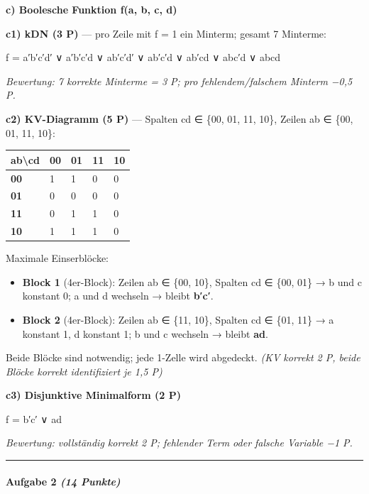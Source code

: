 \documentclass[11pt, a4paper]{article}
\begin{document}
\textbf{c) Boolesche Funktion f(a, b, c, d)}


\textbf{c1) kDN (3 P)} — pro Zeile mit f = 1 ein Minterm; gesamt 7 Minterme:


f = a′b′c′d′ ∨ a′b′c′d ∨ ab′c′d′ ∨ ab′c′d ∨ ab′cd ∨ abc′d ∨ abcd


\textit{Bewertung: 7 korrekte Minterme = 3 P; pro fehlendem/falschem Minterm −0,5 P.}


\textbf{c2) KV-Diagramm (5 P)} — Spalten cd ∈ \{00, 01, 11, 10\}, Zeilen ab ∈ \{00, 01, 11, 10\}:



{\small
\begin{tabularx}{\linewidth}{XXXXX}
\hline
\rowcolor{tableheadbg}
{\color{white}\textbf{ab\textbackslash{}cd}} & {\color{white}\textbf{00}} & {\color{white}\textbf{01}} & {\color{white}\textbf{11}} & {\color{white}\textbf{10}} \\[2pt]
\hline
\endhead
\hline
\endfoot
\textbf{00} & 1 & 1 & 0 & 0 \\
\textbf{01} & 0 & 0 & 0 & 0 \\
\textbf{11} & 0 & 1 & 1 & 0 \\
\textbf{10} & 1 & 1 & 1 & 0 \\
\end{tabularx}
}


Maximale Einserblöcke:

\begin{itemize}
  \item \textbf{Block 1} (4er-Block): Zeilen ab ∈ \{00, 10\}, Spalten cd ∈ \{00, 01\} → b und c konstant 0; a und d wechseln → bleibt \textbf{b′c′}.
  \item \textbf{Block 2} (4er-Block): Zeilen ab ∈ \{11, 10\}, Spalten cd ∈ \{01, 11\} → a konstant 1, d konstant 1; b und c wechseln → bleibt \textbf{ad}.
\end{itemize}

Beide Blöcke sind notwendig; jede 1-Zelle wird abgedeckt. \textit{(KV korrekt 2 P, beide Blöcke korrekt identifiziert je 1,5 P)}


\textbf{c3) Disjunktive Minimalform (2 P)}


f = b′c′ ∨ ad


\textit{Bewertung: vollständig korrekt 2 P; fehlender Term oder falsche Variable −1 P.}



\noindent\textcolor{rulegray}{\rule{\linewidth}{0.4pt}}


\paragraph{Aufgabe 2 \textit{(14 Punkte)}}\mbox{}\\[2pt]
\end{document}
